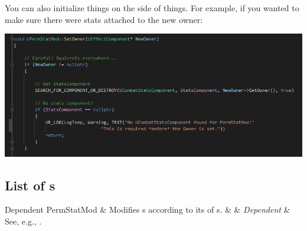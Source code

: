 \newpage

You can also initialize things on the  side of things. For example, if you wanted to make sure there were stats attached to the new owner:

\begin{center}
	\includegraphics[scale=\ScreenshotScale]{../Effects-Documentation/dependent-customization}
\end{center}

\subsection{List of s}

\begin{EffectTable}{Dependent}
	PermStatMod	& {Modifies s according to its  of s.}	&  & \textit{Dependent} & See, e.g., .\\
\end{EffectTable}


\postamble{}